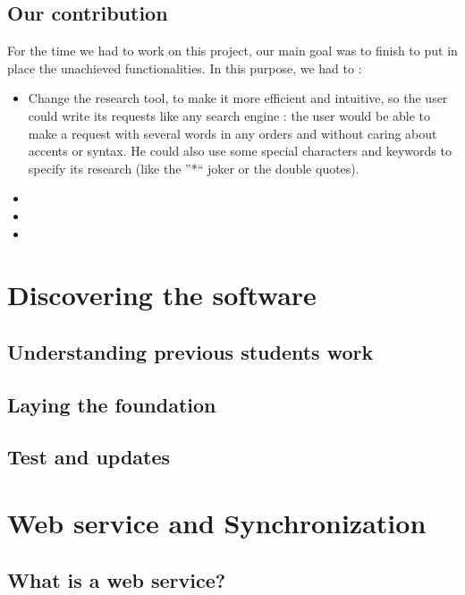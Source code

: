 \documentclass[11pt]{report} %
\begin{document}
\section{Our contribution}
For the time we had to work on this project, our main goal was to finish to put in place the unachieved functionalities. In this purpose, we had to :
\begin{itemize}
\item Change the research tool, to make it more efficient and intuitive, so the user could write its requests like any search engine : the user would be able to make a request with several words in any orders and without caring about accents or syntax. He could also use some special characters and keywords to specify its research (like the ''*`` joker or the double quotes).
\item %
\item %
\item %

\end{itemize}


\chapter{Discovering the software}

\section{Understanding previous students work}
%
%
%
\section{Laying the foundation}
%
%
%
%
\section{Test and updates}
%
%
%

\chapter{Web service and Synchronization}
\section{What is a web service?}
%
%
\end{document}

